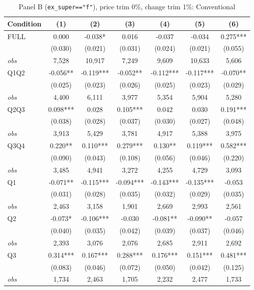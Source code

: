 \begin{table}[!htbp]
\centering
\caption{Panel B (\texttt{ex\_super=="f"}), price trim 0\%, change trim 1\%: Conventional}
\label{tab:b:trim01:conventional}
\small
\begin{tabular}{lcccccc}
\toprule
Condition & (1) & (2) & (3) & (4) & (5) & (6) \\
\midrule
FULL & 0.000 & -0.038* & 0.016 & -0.037 & -0.034 & 0.275*** \\
 & (0.030) & (0.021) & (0.031) & (0.024) & (0.021) & (0.055) \\
\textit{obs} &  7,528 & 10,917 &  7,249 &  9,609 & 10,633 &  5,606 \\
Q1Q2 & -0.056** & -0.119*** & -0.052** & -0.112*** & -0.117*** & -0.070** \\
 & (0.025) & (0.023) & (0.026) & (0.025) & (0.023) & (0.029) \\
\textit{obs} & 4,400 & 6,111 & 3,977 & 5,354 & 5,904 & 5,280 \\
Q2Q3 & 0.098*** & 0.028 & 0.105*** & 0.042 & 0.030 & 0.191*** \\
 & (0.038) & (0.028) & (0.037) & (0.030) & (0.027) & (0.048) \\
\textit{obs} & 3,913 & 5,429 & 3,781 & 4,917 & 5,388 & 3,975 \\
Q3Q4 & 0.220** & 0.110*** & 0.279*** & 0.130** & 0.119*** & 0.582*** \\
 & (0.090) & (0.043) & (0.108) & (0.056) & (0.046) & (0.220) \\
\textit{obs} & 3,485 & 4,941 & 3,272 & 4,255 & 4,729 & 3,093 \\
Q1 & -0.071** & -0.115*** & -0.094*** & -0.143*** & -0.135*** & -0.053 \\
 & (0.031) & (0.028) & (0.035) & (0.032) & (0.029) & (0.035) \\
\textit{obs} & 2,463 & 3,158 & 1,901 & 2,669 & 2,993 & 2,561 \\
Q2 & -0.073* & -0.106*** & -0.030 & -0.081** & -0.090** & -0.057 \\
 & (0.040) & (0.035) & (0.042) & (0.039) & (0.037) & (0.046) \\
\textit{obs} & 2,393 & 3,076 & 2,076 & 2,685 & 2,911 & 2,692 \\
Q3 & 0.314*** & 0.167*** & 0.288*** & 0.176*** & 0.151*** & 0.481*** \\
 & (0.083) & (0.046) & (0.072) & (0.050) & (0.042) & (0.125) \\
\textit{obs} & 1,734 & 2,463 & 1,705 & 2,232 & 2,477 & 1,733 \\

\end{tabular}
\end{table}
